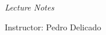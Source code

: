 
\thispagestyle{empty}
\clearpage
\setcounter{page}{-1}

\makeatletter
\begin{titlepage}
{
    \centering
    \vspace{10em}
    \null%
    \vspace{3em}
    {\Huge \bfseries \@title \par}
    \vspace{1em}
    {\Huge \itshape Lecture Notes \par}
    \vspace{2em}
    {\large \scshape \@date \par}
    \vfill
\begin{center}
\end{center}
    \vspace{5em}

    \vfill
    {\raggedleft \large Instructor: Pedro Delicado \par}
    {\raggedleft \large \@author \par}
}
\end{titlepage}
\makeatother
